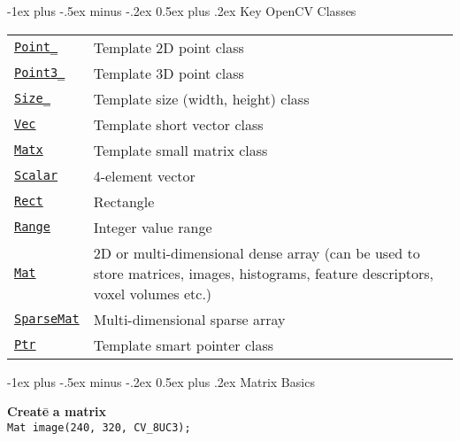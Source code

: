 \documentclass[10pt,landscape]{article}
\makeatletter
\renewcommand{\section}{\@startsection{section}{1}{0mm}%
                                {-1ex plus -.5ex minus -.2ex}%
                                {0.5ex plus .2ex}%
                                {\normalfont\large\bfseries}}
\makeatother
\begin{document}
\begin{multicols}{3}
\section{Key OpenCV Classes}
\begin{tabular}{@{}p{\the\MyLen}%
                @{}p{\linewidth-\the\MyLen}@{}}
\texttt{\href{http://docs.opencv.org/modules/core/doc/basic_structures.html\#Point_}{Point\_}} & Template 2D point class \\
\texttt{\href{http://docs.opencv.org/modules/core/doc/basic_structures.html\#Point3_}{Point3\_}} & Template 3D point class \\
\texttt{\href{http://docs.opencv.org/modules/core/doc/basic_structures.html\#Size_}{Size\_}} & Template size (width, height) class \\
\texttt{\href{http://docs.opencv.org/modules/core/doc/basic_structures.html\#Vec}{Vec}} & Template short vector class \\
\texttt{\href{http://docs.opencv.org/modules/core/doc/basic_structures.html\#Matx}{Matx}} & Template small matrix class \\
\texttt{\href{http://docs.opencv.org/modules/core/doc/basic_structures.html\#Scalar_}{Scalar}} & 4-element vector \\
\texttt{\href{http://docs.opencv.org/modules/core/doc/basic_structures.html\#Rect_}{Rect}} & Rectangle \\
\texttt{\href{http://docs.opencv.org/modules/core/doc/basic_structures.html\#Range}{Range}} & Integer value range \\
\texttt{\href{http://docs.opencv.org/modules/core/doc/basic_structures.html\#Mat}{Mat}} & 2D or multi-dimensional dense array (can be used to store matrices, images, histograms, feature descriptors, voxel volumes etc.)\\
\texttt{\href{http://docs.opencv.org/modules/core/doc/basic_structures.html\#sparsemat}{SparseMat}} & Multi-dimensional sparse array \\
\texttt{\href{http://docs.opencv.org/modules/core/doc/basic_structures.html\#Ptr}{Ptr}} & Template smart pointer class
\end{tabular}

\section{Matrix Basics}
\begin{tabbing}

\textbf{Cr}\=\textbf{ea}\=\textbf{te}\={} \textbf{a matrix} \\
\> \texttt{Mat image(240, 320, CV\_8UC3);} \\


\end{tabbing}
\end{multicols}
\end{document}
